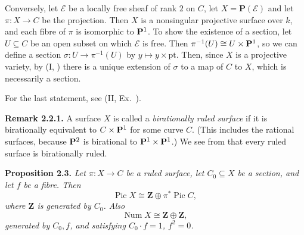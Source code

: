 {Conversely, let $\mathcal E$ be a locally free sheaf of rank $2$ on $C$, let $X=\mathbf P(\mathcal E)$ and let $\pi\colon X\to C$ be the projection. Then $X$ is a nonsingular projective surface over $k$, and each fibre of $\pi$ is isomorphic to $\mathbf{P}^1$. To show the existence of a section, let $U\subseteq C$ be an open subset on which $\mathcal E$ is free. Then $\pi^{-1}(U)\cong U\times\mathbf{P}^1$, so we can define a section $\sigma\colon U\to\pi^{-1}(U)$ by $y\mapsto y\times\mathrm{pt}$. Then, since $X$ is a projective variety, by (I, ) there is a unique extension of $\sigma$ to a map of $C$ to $X$, which is necessarily a section.

For the last statement, see (II, Ex.~).

\medskip
\noindent\hypertarget{result-V-2.2.1}{}\textbf{Remark 2.2.1.} A surface $X$ is called a \emph{birationally ruled surface} if it is birationally equivalent to $C\times\mathbf{P}^1$ for some curve $C$. (This includes the rational surfaces, because $\mathbf{P}^2$ is birational to $\mathbf{P}^1\times\mathbf{P}^1$.) We see from  that every ruled surface is birationally ruled.

\medskip
\noindent\hypertarget{result-V-2.3}{}\textbf{Proposition 2.3.} \emph{Let $\pi\colon X\to C$ be a ruled surface, let $C_0\subseteq X$ be a section, and let $f$ be a fibre. Then}
\[
\operatorname{Pic}X\cong\mathbf Z\oplus\pi^*\operatorname{Pic}C,
\]
\emph{where $\mathbf Z$ is generated by $C_0$. Also}
\[
\operatorname{Num}X\cong\mathbf Z\oplus\mathbf Z,
\]
\emph{generated by $C_0,f$, and satisfying $C_0\cdot f=1$, $f^2=0$.}
}
